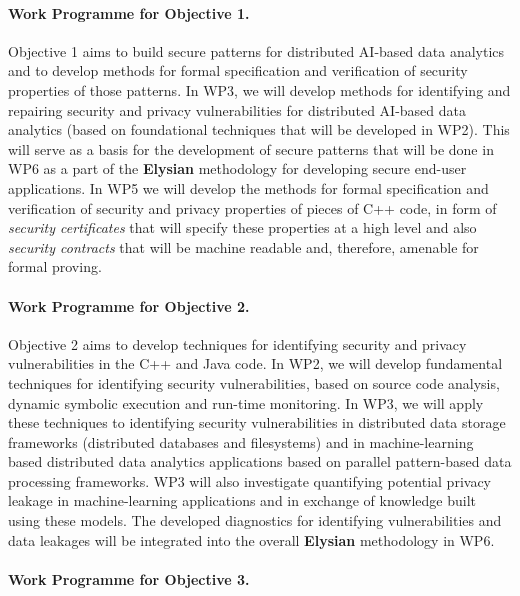 \documentclass[a4paper,11pt]{article}
\newcommand{\project}[1]{\textbf{#1}\xspace}
\newcommand{\SECURITY}{\project{Elysian}}
\newcommand{\TheProject}{\SECURITY}
\begin{document}
\paragraph*{Work Programme for Objective 1.}

Objective 1 aims to build secure patterns for distributed AI-based data analytics and to develop methods for formal specification and verification of security properties of those patterns. In WP3, we will develop methods for identifying and repairing security and privacy vulnerabilities for distributed AI-based data analytics (based on foundational techniques that will be developed in WP2). This will serve as a basis for the development of secure patterns that will be done in WP6 as a part of the \TheProject{} methodology for developing secure end-user applications. In WP5 we will develop the methods for formal specification and verification of security and privacy properties of pieces of C++ code, in form of \emph{security certificates} that will specify these properties at a high level and also \emph{security contracts} that will be machine readable and, therefore, amenable for formal proving. 

\paragraph*{Work Programme for Objective 2.}

Objective 2 aims to develop techniques for identifying security and privacy vulnerabilities in the C++ and Java code. In WP2, we will develop fundamental techniques for identifying security vulnerabilities, based on source code analysis, dynamic symbolic execution and run-time monitoring. In WP3, we will apply these techniques to identifying security vulnerabilities in distributed data storage frameworks (distributed databases and filesystems) and in machine-learning based distributed data analytics applications based on parallel pattern-based data processing frameworks. WP3 will also investigate quantifying potential privacy leakage in machine-learning applications and in exchange of knowledge built using these models. The developed diagnostics for identifying vulnerabilities and data leakages will be integrated into the overall \TheProject{} methodology in WP6.

\paragraph{Work Programme for Objective 3.}
\end{document}
